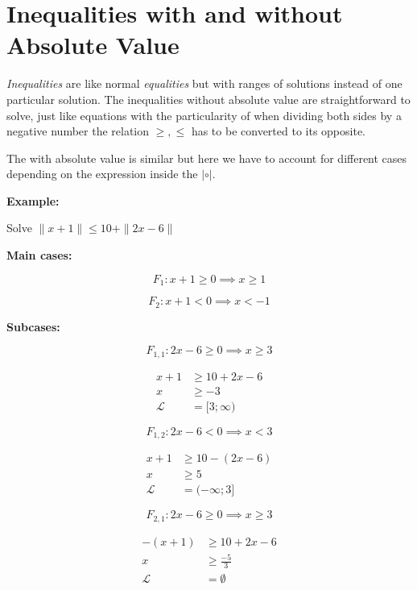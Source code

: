 \newpage
\section{Inequalities with and without Absolute Value}

\emph{Inequalities} are like normal \emph{equalities} but with ranges of solutions 
instead of one particular solution. The inequalities without absolute value are straightforward 
to solve, just like equations with the particularity of when dividing both sides by a negative number 
the relation \(<, > \ge, \le\) has to be converted to its opposite.
\vspace{\baselineskip}

The with absolute value is similar but here we have to account for different cases depending on the 
expression inside the \(|\circ|\).
\vspace{\baselineskip}

\textbf{Example:}
\vspace{\baselineskip}

Solve \(\|x + 1 \| \le 10 + \|2x - 6\|\)
\vspace{\baselineskip}

\textbf{Main cases:}

\[
    F_1: x + 1 \ge 0 \implies x \ge 1
\]

\[
    F_2: x + 1 < 0 \implies x < -1
\]

\textbf{Subcases:}

\[
    F_{1,1}: 2x - 6 \ge 0  \implies x \ge 3
\]

\begin{align*}
    x + 1 &\ge 10 + 2x - 6 \\
    x &\ge -3 \\
    \mathcal{L} &= [3; \infty )
\end{align*}


\[
    F_{1,2}: 2x - 6 < 0  \implies x < 3
\]

\begin{align*}
    x + 1 &\ge 10 - (2x - 6) \\
    x &\ge 5 \\
    \mathcal{L} &= (-\infty; 3]
\end{align*}

\[
    F_{2,1}: 2x - 6 \ge 0 \implies x \ge 3
\]

\begin{align*}
   -(x + 1 ) &\ge 10 + 2x - 6 \\
    x &\ge \frac{-5}{3} \\
    \mathcal{L} &= \emptyset
\end{align*}

